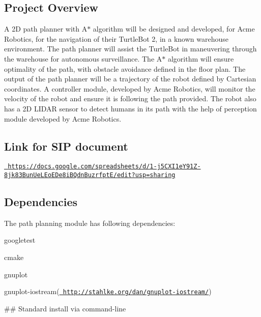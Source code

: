 \subsection*{Project Overview}

A 2D path planner with A$\ast$ algorithm will be designed and developed, for Acme Robotics, for the navigation of their Turtle\+Bot 2, in a known warehouse environment. The path planner will assist the Turtle\+Bot in maneuvering through the warehouse for autonomous surveillance. The A$\ast$ algorithm will ensure optimality of the path, with obstacle avoidance defined in the floor plan. The output of the path planner will be a trajectory of the robot defined by Cartesian coordinates. A controller module, developed by Acme Robotics, will monitor the velocity of the robot and ensure it is following the path provided. The robot also has a 2D L\+I\+D\+AR sensor to detect humans in its path with the help of perception module developed by Acme Robotics.

\subsection*{Link for S\+IP document}

\href{https://docs.google.com/spreadsheets/d/1-j5CXI1eY91Z-8jk83BunUeLEoEDe8iBQdnBuzrfptE/edit?usp=sharing}\texttt{ https\+://docs.\+google.\+com/spreadsheets/d/1-\/j5\+C\+X\+I1e\+Y91\+Z-\/8jk83\+Bun\+Ue\+L\+Eo\+E\+De8i\+B\+Qdn\+Buzrfpt\+E/edit?usp=sharing}

\subsection*{Dependencies}

The path planning module has following dependencies\+:
\begin{DoxyEnumerate}
\item googletest
\item cmake
\item gnuplot
\item gnuplot-\/iostream(\href{http://stahlke.org/dan/gnuplot-iostream/}\texttt{ http\+://stahlke.\+org/dan/gnuplot-\/iostream/})
\end{DoxyEnumerate}

\#\# Standard install via command-\/line 
\begin{DoxyCode}{0}
\end{DoxyCode}
